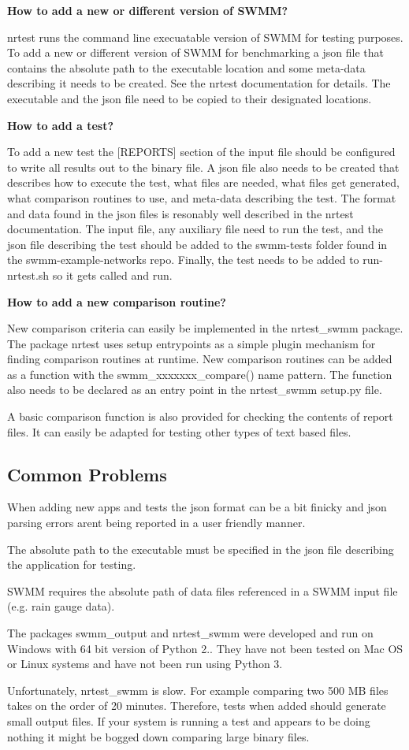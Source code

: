 {\bfseries{How to add a new or different version of S\+W\+MM?}}

nrtest runs the command line execuatable version of S\+W\+MM for testing purposes. To add a new or different version of S\+W\+MM for benchmarking a json file that contains the absolute path to the executable location and some meta-\/data describing it needs to be created. See the nrtest documentation for details. The executable and the json file need to be copied to their designated locations.

{\bfseries{How to add a test?}}

To add a new test the \mbox{[}R\+E\+P\+O\+R\+TS\mbox{]} section of the input file should be configured to write all results out to the binary file. A json file also needs to be created that describes how to execute the test, what files are needed, what files get generated, what comparison routines to use, and meta-\/data describing the test. The format and data found in the json files is resonably well described in the nrtest documentation. The input file, any auxiliary file need to run the test, and the json file describing the test should be added to the swmm-\/tests folder found in the swmm-\/example-\/networks repo. Finally, the test needs to be added to run-\/nrtest.\+sh so it gets called and run.

{\bfseries{How to add a new comparison routine?}}

New comparison criteria can easily be implemented in the nrtest\+\_\+swmm package. The package nrtest uses setup entrypoints as a simple plugin mechanism for finding comparison routines at runtime. New comparison routines can be added as a function with the swmm\+\_\+xxxxxxx\+\_\+compare() name pattern. The function also needs to be declared as an entry point in the nrtest\+\_\+swmm setup.\+py file.

A basic comparison function is also provided for checking the contents of report files. It can easily be adapted for testing other types of text based files.

\subsection*{Common Problems}

When adding new apps and tests the json format can be a bit finicky and json parsing errors aren\textquotesingle{}t being reported in a user friendly manner.

The absolute path to the executable must be specified in the json file describing the application for testing.

S\+W\+MM requires the absolute path of data files referenced in a S\+W\+MM input file (e.\+g. rain gauge data).

The packages swmm\+\_\+output and nrtest\+\_\+swmm were developed and run on Windows with 64 bit version of Python 2.. They have not been tested on Mac OS or Linux systems and have not been run using Python 3.

Unfortunately, nrtest\+\_\+swmm is slow. For example comparing two 500 MB files takes on the order of 20 minutes. Therefore, tests when added should generate small output files. If your system is running a test and appears to be doing nothing it might be bogged down comparing large binary files. 